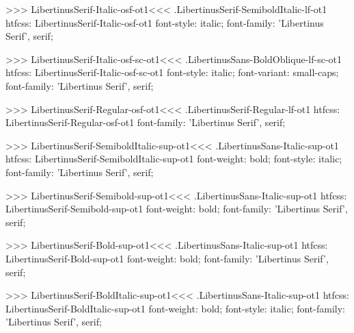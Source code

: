 {{{{>>>
\<LibertinusSerif-Italic-osf-ot1\><<<
.LibertinusSerif-SemiboldItalic-lf-ot1
htfcss:  LibertinusSerif-Italic-osf-ot1  font-style: italic; font-family: 'Libertinus Serif', serif;

>>>
\<LibertinusSerif-Italic-osf-sc-ot1\><<<
.LibertinusSans-BoldOblique-lf-sc-ot1
htfcss:  LibertinusSerif-Italic-osf-sc-ot1  font-style: italic; font-variant: small-caps; font-family: 'Libertinus Serif', serif;

>>>
\<LibertinusSerif-Regular-osf-ot1\><<<
.LibertinusSerif-Regular-lf-ot1
htfcss:  LibertinusSerif-Regular-osf-ot1  font-family: 'Libertinus Serif', serif;

>>>
\<LibertinusSerif-SemiboldItalic-sup-ot1\><<<
.LibertinusSans-Italic-sup-ot1
htfcss:  LibertinusSerif-SemiboldItalic-sup-ot1  font-weight: bold; font-style: italic; font-family: 'Libertinus Serif', serif;

>>>
\<LibertinusSerif-Semibold-sup-ot1\><<<
.LibertinusSans-Italic-sup-ot1
htfcss:  LibertinusSerif-Semibold-sup-ot1  font-weight: bold; font-family: 'Libertinus Serif', serif;

>>>
\<LibertinusSerif-Bold-sup-ot1\><<<
.LibertinusSans-Italic-sup-ot1
htfcss:  LibertinusSerif-Bold-sup-ot1  font-weight: bold; font-family: 'Libertinus Serif', serif;

>>>
\<LibertinusSerif-BoldItalic-sup-ot1\><<<
.LibertinusSans-Italic-sup-ot1
htfcss:  LibertinusSerif-BoldItalic-sup-ot1  font-weight: bold; font-style: italic; font-family: 'Libertinus Serif', serif;

}}}}
